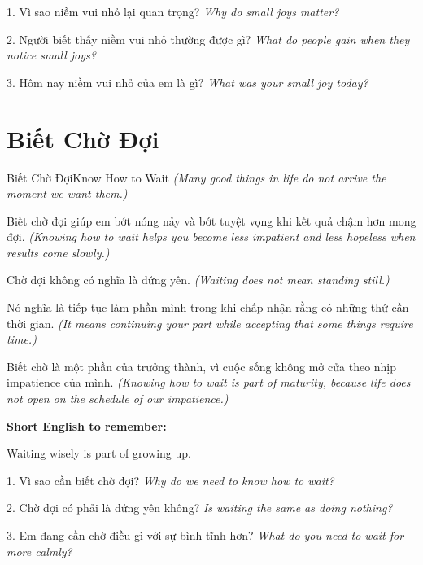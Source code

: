 \begin{tuhocnhanh}
1. Vì sao niềm vui nhỏ lại quan trọng? \textit{Why do small joys matter?}

2. Người biết thấy niềm vui nhỏ thường được gì? \textit{What do people gain when they notice small joys?}

3. Hôm nay niềm vui nhỏ của em là gì? \textit{What was your small joy today?}
\end{tuhocnhanh}
\ngancach

\section{Biết Chờ Đợi}
\begin{truyen}{Biết Chờ Đợi}{Know How to Wait}
\textit{(Many good things in life do not arrive the moment we want them.)}

Biết chờ đợi giúp em bớt nóng nảy và bớt tuyệt vọng khi kết quả chậm hơn mong đợi.
\textit{(Knowing how to wait helps you become less impatient and less hopeless when results come slowly.)}

Chờ đợi không có nghĩa là đứng yên.
\textit{(Waiting does not mean standing still.)}

Nó nghĩa là tiếp tục làm phần mình trong khi chấp nhận rằng có những thứ cần thời gian.
\textit{(It means continuing your part while accepting that some things require time.)}
\end{truyen}

\begin{baihoc}
Biết chờ là một phần của trưởng thành, vì cuộc sống không mở cửa theo nhịp impatience của mình.
\textit{(Knowing how to wait is part of maturity, because life does not open on the schedule of our impatience.)}
\end{baihoc}

\begin{ghinhoanh}
\textbf{Short English to remember:}

Waiting wisely is part of growing up.

\end{ghinhoanh}

\begin{tuhocnhanh}
1. Vì sao cần biết chờ đợi? \textit{Why do we need to know how to wait?}

2. Chờ đợi có phải là đứng yên không? \textit{Is waiting the same as doing nothing?}

3. Em đang cần chờ điều gì với sự bình tĩnh hơn? \textit{What do you need to wait for more calmly?}
\end{tuhocnhanh}
\ngancach

